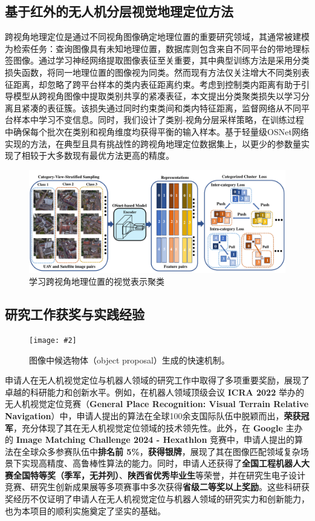 \documentclass[12pt]{article}
\newcommand{\addImg}[2][1.0]{\texttt{[image: \#2]}}
\newcommand{\myEmph}[1]{\textbf{\textcolor[rgb]{0,0,0.25}{#1}}}
\begin{document}
\subsection{基于红外的无人机分层视觉地理定位方法}

跨视角地理定位是通过不同视角图像确定地理位置的重要研究领域，其通常被建模为检索任务：查询图像具有未知地理位置，数据库则包含来自不同平台的带地理标签图像。通过学习神经网络提取图像表征至关重要，其中典型训练方法是采用分类损失函数，将同一地理位置的图像视为同类。然而现有方法仅关注增大不同类别表征距离，却忽略了跨平台样本的类内表征距离约束。考虑到控制类内距离有助于引导模型从跨视角图像中提取类别共享的紧凑表征，本文提出分类聚类损失以学习分离且紧凑的表征簇。该损失通过同时约束类间和类内特征距离，监督网络从不同平台样本中学习不变信息。同时，我们设计了类别-视角分层采样策略，在训练过程中确保每个批次在类别和视角维度均获得平衡的输入样本。基于轻量级OSNet网络实现的方法，在典型且具有挑战性的跨视角地理定位数据集上，以更少的参数量实现了相较于大多数现有最优方法更高的精度。
\begin{figure}[htb]
	\centering
	\includegraphics[width=\linewidth]{figures/existingwork/MAP2.pdf}
	\caption{学习跨视角地理位置的视觉表示聚类}
	\label{osnet}
\end{figure}

\subsection{研究工作获奖与实践经验}


\begin{figure}[ht]
    \centering
    \addImg[.8]{figures/awards.jpg}
    \caption{图像中候选物体（object proposal）生成的快速机制。}
    \label{fig:award}
\end{figure}


申请人在无人机视觉定位与机器人领域的研究工作中取得了多项重要奖励，展现了卓越的科研能力和创新水平。例如，在机器人领域顶级会议 \myEmph{ICRA 2022} 举办的无人机视觉定位竞赛（\myEmph{General Place Recognition: Visual Terrain Relative Navigation}）中，申请人提出的算法在全球100余支国际队伍中脱颖而出，\myEmph{荣获冠军}，充分体现了其在无人机视觉定位领域的技术领先性。此外，在 \myEmph{Google} 主办的 \myEmph{Image Matching Challenge 2024 - Hexathlon} 竞赛中，申请人提出的算法在全球众多参赛队伍中\myEmph{排名前 5\%}，\myEmph{获得银牌}，展现了其在图像匹配领域复杂场景下实现高精度、高鲁棒性算法的能力。同时，申请人还获得了\myEmph{全国工程机器人大赛全国特等奖（季军，无并列）}、\myEmph{陕西省优秀毕业生}等荣誉，并在研究生电子设计竞赛、研究生创新成果展等多项赛事中多次获得\myEmph{省级二等奖以上奖励}。这些科研获奖经历不仅证明了申请人在无人机视觉定位与机器人领域的研究实力和创新能力，也为本项目的顺利实施奠定了坚实的基础。
\end{document}
